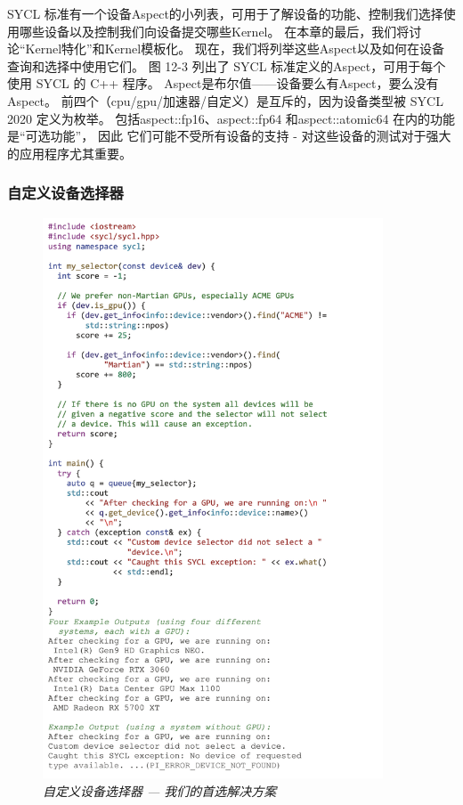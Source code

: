 SYCL 标准有一个设备Aspect的小列表，可用于了解设备的功能、控制我们选择使用哪些设备以及控制我们向设备提交哪些Kernel。 
在本章的最后，我们将讨论“Kernel特化”和Kernel模板化。 现在，我们将列举这些Aspect以及如何在设备查询和选择中使用它们。 
图 12-3 列出了 SYCL 标准定义的Aspect，可用于每个使用 SYCL 的 C++ 程序。 
Aspect是布尔值——设备要么有Aspect，要么没有Aspect。 
前四个（cpu/gpu/加速器/自定义）是互斥的，因为设备类型被 SYCL 2020 定义为枚举。
包括aspect::fp16、aspect::fp64 和aspect::atomic64 在内的功能是“可选功能”，
因此 它们可能不受所有设备的支持 - 对这些设备的测试对于强大的应用程序尤其重要。

\subsubsection{自定义设备选择器}
\begin{figure}[H]
	\centering
	\includegraphics[width=0.9\textwidth]{figs/F12.4.png}
	\caption{\textit{自定义设备选择器 — 我们的首选解决方案 }}
\end{figure}


